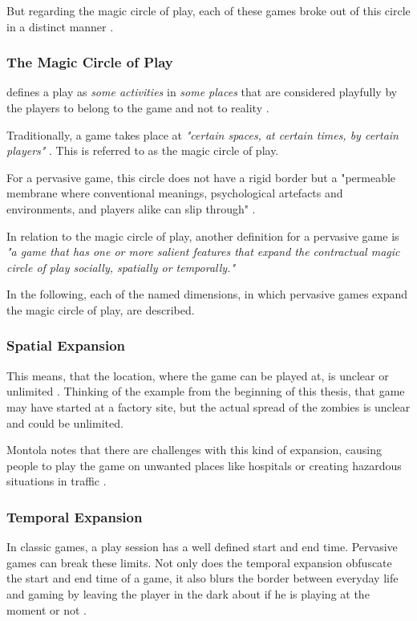 But regarding the magic circle of play, each of these games broke out of this circle in a distinct manner \citep{montola2005exploring}.

\subsubsection{The Magic Circle of Play}
\citeauthor{huizinga1955homo} defines a play as \emph{some activities} in \emph{some places} that are considered playfully by the players to belong to the game and not to reality \citep{huizinga1955homo}.

Traditionally, a game takes place at \emph{"certain spaces, at certain times, by certain players"} \citep{montola2005exploring}. This is referred to as the magic circle of play.

For a pervasive game, this circle does not have a rigid border but a "permeable membrane where conventional meanings, psychological artefacts and environments, and players alike can slip through" \citep{nieuwdorp2009pervasive}.

In relation to the magic circle of play, another definition for a pervasive game is \emph{"a game that has one or more salient features that expand the contractual magic circle of play socially, spatially or temporally."} \citep{montola2005exploring}

In the following, each of the named dimensions, in which pervasive games expand the magic circle of play, are described.

\subsubsection{Spatial Expansion}
This means, that the location, where the game can be played at, is unclear or unlimited \citep{montola2005exploring}. Thinking of the example from the beginning of this thesis, that game may have started at a factory site, but the actual spread of the zombies is unclear and could be unlimited.

Montola notes that there are challenges with this kind of expansion, causing people to play the game on unwanted places like hospitals or creating hazardous situations in traffic \citep{montola2005exploring}.

\subsubsection{Temporal Expansion}
In classic games, a play session has a well defined start and end time. Pervasive games can break these limits. Not only does the temporal expansion obfuscate the start and end time of a game, it also blurs the border between everyday life and gaming by leaving the player in the dark about if he is playing at the moment or not \citep{montola2005exploring}.

